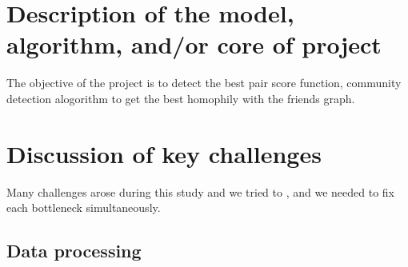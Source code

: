 \documentclass[11pt]{article}
\begin{document}













\section{Description of the model, algorithm, and/or core of project}

The objective of the project is to detect the best pair score function, community detection alogorithm to get the best homophily with the friends graph.




\section{Discussion of key challenges}

Many challenges arose during this study and we tried to , and we needed to fix each bottleneck simultaneously.

\subsection{Data processing}
\end{document}
